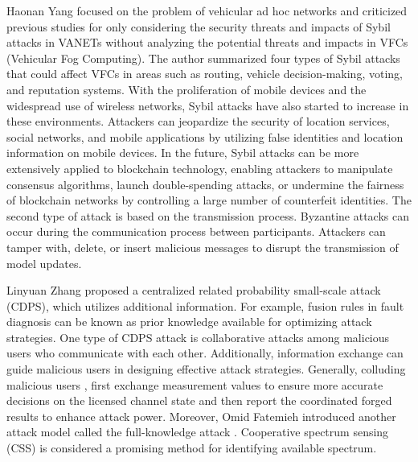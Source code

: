 \documentclass[conference]{IEEEtran}
\begin{document}
Haonan Yang \cite{b113} focused on the problem of vehicular ad hoc networks and criticized previous studies for only considering the security threats and impacts of Sybil attacks in VANETs without analyzing the potential threats and impacts in VFCs (Vehicular Fog Computing). The author summarized four types of Sybil attacks that could affect VFCs in areas such as routing, vehicle decision-making, voting, and reputation systems.
With the proliferation of mobile devices and the widespread use of wireless networks, Sybil attacks have also started to increase in these environments. Attackers can jeopardize the security of location services, social networks, and mobile applications by utilizing false identities and location information on mobile devices. In the future, Sybil attacks can be more extensively applied to blockchain technology, enabling attackers to manipulate consensus algorithms, launch double-spending attacks, or undermine the fairness of blockchain networks by controlling a large number of counterfeit identities.
The second type of attack is based on the transmission process. Byzantine attacks can occur during the communication process between participants. Attackers can tamper with, delete, or insert malicious messages to disrupt the transmission of model updates.

Linyuan Zhang \cite{b114} proposed a centralized related probability small-scale attack (CDPS), which utilizes additional information.
For example, fusion rules in fault diagnosis \cite{b115} can be known as prior knowledge available for optimizing attack strategies.
One type of CDPS attack is collaborative attacks among malicious users who communicate with each other.
Additionally, information exchange can guide malicious users in designing effective attack strategies.
Generally, colluding malicious users \cite{b116},\cite{b117} first exchange measurement values to ensure more accurate
decisions on the licensed channel state and then report the coordinated forged results to enhance attack power.
Moreover, Omid Fatemieh introduced another attack model called the full-knowledge attack \cite{b118}.
Cooperative spectrum sensing (CSS) is considered a promising method for identifying available spectrum.
\end{document}
